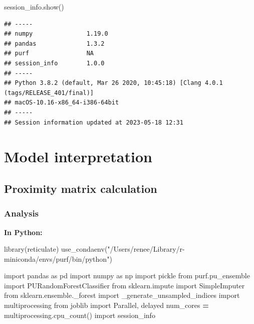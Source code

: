 \documentclass[
  11pt,
  oneside]{book}
\newenvironment{Shaded}{\begin{snugshade}}{\end{snugshade}}
\newcommand{\FunctionTok}[1]{\textcolor[rgb]{0.00,0.00,0.00}{#1}}
\newcommand{\ImportTok}[1]{#1}
\newcommand{\NormalTok}[1]{#1}
\newcommand{\OperatorTok}[1]{\textcolor[rgb]{0.81,0.36,0.00}{\textbf{#1}}}
\newcommand{\StringTok}[1]{\textcolor[rgb]{0.31,0.60,0.02}{#1}}
\begin{document}
\begin{Shaded}
\begin{Highlighting}[]
\NormalTok{session\_info.show()}
\end{Highlighting}
\end{Shaded}

\begin{verbatim}
## -----
## numpy               1.19.0
## pandas              1.3.2
## purf                NA
## session_info        1.0.0
## -----
## Python 3.8.2 (default, Mar 26 2020, 10:45:18) [Clang 4.0.1 (tags/RELEASE_401/final)]
## macOS-10.16-x86_64-i386-64bit
## -----
## Session information updated at 2023-05-18 12:31
\end{verbatim}

\hypertarget{05_model_interpretation}{%
\chapter{Model interpretation}\label{05_model_interpretation}}

\hypertarget{proximity-matrix-calculation}{%
\section{Proximity matrix calculation}\label{proximity-matrix-calculation}}

\hypertarget{analysis-4}{%
\subsection{Analysis}\label{analysis-4}}

\textbf{In Python: }

\begin{Shaded}
\begin{Highlighting}[]
\FunctionTok{library}\NormalTok{(reticulate)}
\FunctionTok{use\_condaenv}\NormalTok{(}\StringTok{"/Users/renee/Library/r{-}miniconda/envs/purf/bin/python"}\NormalTok{)}
\end{Highlighting}
\end{Shaded}

\begin{Shaded}
\begin{Highlighting}[]
\ImportTok{import}\NormalTok{ pandas }\ImportTok{as}\NormalTok{ pd}
\ImportTok{import}\NormalTok{ numpy }\ImportTok{as}\NormalTok{ np}
\ImportTok{import}\NormalTok{ pickle}
\ImportTok{from}\NormalTok{ purf.pu\_ensemble }\ImportTok{import}\NormalTok{ PURandomForestClassifier}
\ImportTok{from}\NormalTok{ sklearn.impute }\ImportTok{import}\NormalTok{ SimpleImputer}
\ImportTok{from}\NormalTok{ sklearn.ensemble.\_forest }\ImportTok{import}\NormalTok{ \_generate\_unsampled\_indices}
\ImportTok{import}\NormalTok{ multiprocessing}
\ImportTok{from}\NormalTok{ joblib }\ImportTok{import}\NormalTok{ Parallel, delayed}
\NormalTok{num\_cores }\OperatorTok{=}\NormalTok{ multiprocessing.cpu\_count()}
\ImportTok{import}\NormalTok{ session\_info}
\end{Highlighting}
\end{Shaded}
\end{document}
